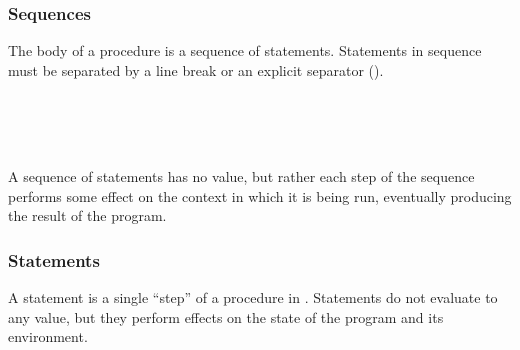 \begin{prooftree}
\end{prooftree}

\subsubsection{Sequences}

The body of a procedure is a sequence of statements. Statements in sequence
must be separated by a line break or an explicit separator (\op{,}).

\begin{bnf*}
     \\
     \\
     \\
\end{bnf*}

A sequence of statements has no value, but rather each step of the sequence
performs some effect on the context in which it is being run, eventually
producing the result of the program.

\begin{prooftree}
\end{prooftree}

\begin{prooftree}
\end{prooftree}

\subsubsection{Statements}

A statement is a single ``step'' of a procedure in \Prose{}. Statements do not
evaluate to any value, but they perform effects on the state of the program and
its environment.

